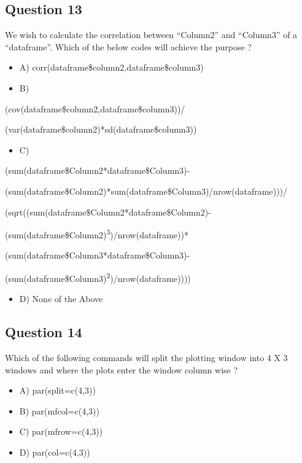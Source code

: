 \documentclass[11pt]{article}
\begin{document}
\subsection*{Question 13}
\label{sec:org93f8996}
We wish to calculate the correlation between “Column2” and “Column3” of a
“dataframe”. Which of the below codes will achieve the purpose ?

\begin{itemize}
\item A) corr(dataframe\$column2,dataframe\$column3)

\item B)
\end{itemize}

(cov(dataframe\$column2,dataframe\$column3))/

(var(dataframe\$column2)*sd(dataframe\$column3))

\begin{itemize}
\item C)
\end{itemize}

(sum(dataframe\$Column2*dataframe\$Column3)-

(sum(dataframe\$Column2)*sum(dataframe\$Column3)/nrow(dataframe)))/

(sqrt((sum(dataframe\$Column2*dataframe\$Column2)-

(sum(dataframe\$Column2)\textsuperscript{3})/nrow(dataframe))*

(sum(dataframe\$Column3*dataframe\$Column3)-

(sum(dataframe\$Column3)\textsuperscript{2})/nrow(dataframe))))

\begin{itemize}
\item D) None of the Above
\end{itemize}

\subsection*{Question 14}
\label{sec:org22dcc57}
Which of the following commands will split the plotting window into 4 X 3
windows and where the plots enter the window column wise ?

\begin{itemize}
\item A) par(split=c(4,3))

\item B) par(mfcol=c(4,3))

\item C) par(mfrow=c(4,3))

\item D) par(col=c(4,3))
\end{itemize}
\end{document}
